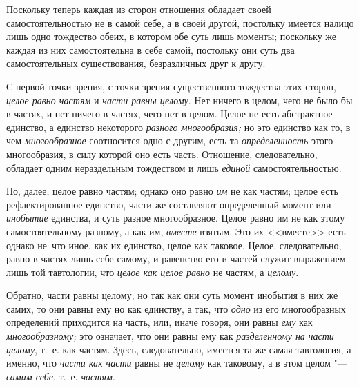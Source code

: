 Поскольку теперь каждая из сторон отношения обладает своей
самостоятельностью не в самой себе, а в своей другой, постольку имеется
налицо лишь одно тождество обеих, в котором обе суть лишь моменты;
поскольку же каждая из них самостоятельна в себе самой, постольку они суть
два самостоятельных существования, безразличных друг к другу.

С первой точки зрения, с точки зрения существенного тождества этих сторон,
{\em целое равно частям} и {\em части равны целому}. Нет ничего в целом, чего
не было бы в частях, и нет ничего в частях, чего нет в целом. Целое не есть
абстрактное единство, а единство некоторого
{\em разного многообразия;} но это единство как то, в чем
{\em многообразное} соотносится одно с другим, есть
та {\em определенность} этого многообразия, в силу
которой оно есть часть. Отношение, следовательно, обладает одним
нераздельным тождеством и лишь {\em единой} самостоятельностью.

Но, далее, целое равно частям; однако оно равно {\em им}
не как частям; целое есть рефлектированное единство, части же составляют
определенный момент или {\em инобытие} единства, и суть
разное многообразное. Целое равно им не как этому самостоятельному разному,
а как им, {\em вместе} взятым. Это их <<вместе>> есть
однако не~что иное, как их единство, целое как таковое. Целое,
следовательно, равно в частях лишь себе самому, и равенство его и частей
служит выражением лишь той тавтологии, что {\em целое
как целое равно} не частям, а {\em целому}.

Обратно, части равны целому; но так как они суть момент инобытия в них же
самих, то они равны ему но как единству, а так, что
{\em одно} из его многообразных определений приходится
на часть, или, иначе говоря, они равны {\em ему} как
{\em многообразному;} это означает, что они равны ему
как {\em разделенному на части целому}, т.~е. как
частям. Здесь, следовательно, имеется та же самая тавтология, а именно, что
{\em части как части} равны не {\em целому} как таковому, а в этом целом
"--- {\em самим себе}, т.~е. {\em частям}.


